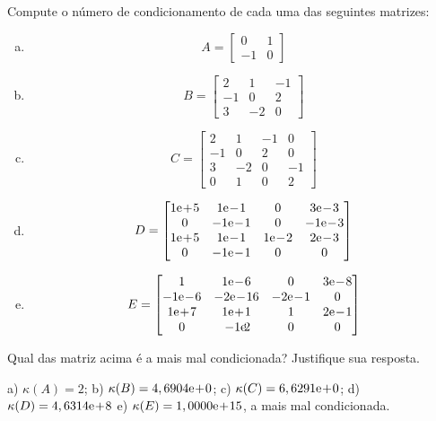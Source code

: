 \begin{exer}
  Compute o número de condicionamento de cada uma das seguintes matrizes:
  \begin{enumerate}[a)]
  \item
    \begin{equation}
      A =
      \begin{bmatrix}
        0 & 1\\
        -1 & 0
      \end{bmatrix}
    \end{equation}
  \item 
    \begin{equation}
      B =
      \begin{bmatrix}
        2 & 1 & -1\\
        -1 & 0 & 2\\
        3 & -2 & 0
      \end{bmatrix}
    \end{equation}
  \item 
    \begin{equation}
      C =
      \begin{bmatrix}
        2 & 1 & -1 & 0\\
        -1 & 0 & 2 & 0\\
        3 & -2 & 0 & -1\\
        0 & 1 & 0 & 2
      \end{bmatrix}
    \end{equation}
  \item
    \begin{equation}
      D =
      \begin{bmatrix}
        1\E+5 & 1\E-1 & 0 & 3\E-3\\
        0 & -1\E-1 & 0 & -1\E-3\\
        1\E+5 & 1\E-1 & 1\E-2 & 2\E-3\\
        0 & -1\E-1 & 0 & 0
      \end{bmatrix}
    \end{equation}
    \item
      \begin{equation}
        E =
        \begin{bmatrix}
          1 & 1\E-6 & 0 & 3\E-8 \\
          -1\E-6 & -2\E-16 & -2\E-1 & 0\\
          1\E+7 & 1\E+1 & 1 & 2\E-1 \\
          0 & -1\E2 & 0 & 0
      \end{bmatrix}
    \end{equation}
  \end{enumerate}
  Qual das matriz acima é a mais mal condicionada? Justifique sua resposta.
\end{exer}
\begin{resp}
  a) $\kappa(A) = 2$; b) $\kappa(B) = 4,6904\mathrm{e}\!+\!0$; c) $\kappa(C) = 6,6291\mathrm{e}\!+\!0$; d) $\kappa(D) = 4,6314\mathrm{e}\!+\!8$ e) $\kappa(E) = 1,0000\mathrm{e}\!+\!15$, a mais mal condicionada.
\end{resp}

